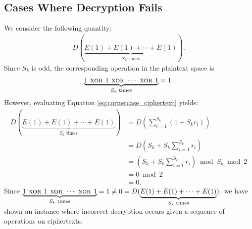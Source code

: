 \subsection{Cases Where Decryption Fails}
We consider the following quantity:
\begin{align}
	\label{eq:cornercase_ciphertext}
	D(\underbrace{E(1)+E(1)+\cdots+E(1)}_{S_k \text{ times}}).
\end{align}
Since $S_k$ is odd, the corresponding operation in the plaintext space is
\begin{align*}
	\label{eq:cornercase_plaintext}
	\underbrace{1 \textsc{ xor } 1 \textsc{ xor } \cdots \textsc{ xor } 1}_{S_k \text{ times}} = 1.
\end{align*}
However, evaluating Equation \ref{eq:cornercase_ciphertext} yields:
\begin{align*}
	D(\underbrace{E(1)+E(1)+\cdots+E(1)}_{S_k \text{ times}})
	&= D\left(\sum_{i=1}^{S_k}{(1+S_kr_i)}\right)\\
	&= D\left(S_k + S_k\sum_{i=1}^{S_k}{r_i}\right)\\
	&= \left(S_k + S_k\sum_{i=1}^{S_k}{r_i}\right) \bmod S_k \bmod 2\\
	&= 0 \bmod 2\\
	&= 0.
\end{align*}
Since $\underbrace{1 \textsc{ xor } 1 \textsc{ xor } \cdots \textsc{ xor } 1}_{S_k \text{ times}} = 1\neq 0 = D(\underbrace{E(1)+E(1)+\cdots+E(1)}_{S_k \text{ times}})$, we have shown an instance where incorrect decryption occurs given a sequence of operations on ciphertexts.


